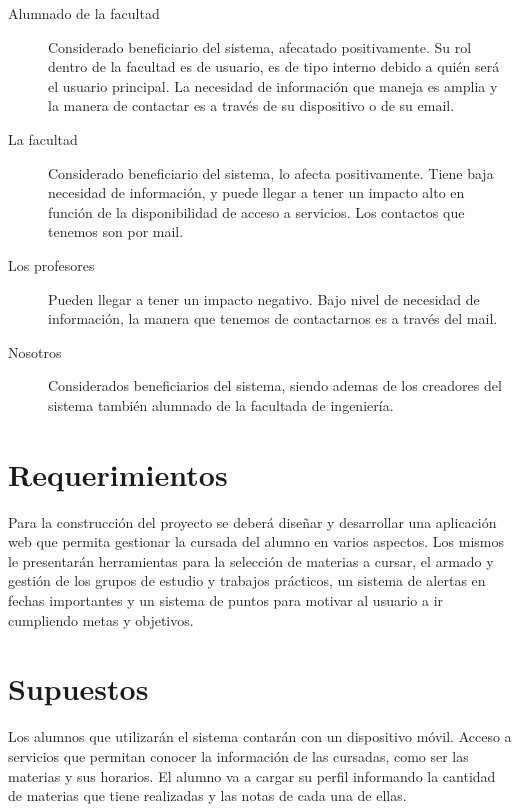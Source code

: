 \documentclass[a4paper,11pt]{article}
\begin{document}
\begin{description}

  \item[Alumnado de la facultad] 

    Considerado beneficiario del sistema, afecatado positivamente. Su rol
    dentro de la facultad es de usuario, es de tipo interno debido a quién será
    el usuario principal. La necesidad de información que maneja es amplia y la
    manera de contactar es a través de su dispositivo o de su email.

  \item[La facultad]

    Considerado beneficiario del sistema, lo afecta positivamente. Tiene baja
    necesidad de información, y puede llegar a tener un impacto alto en función
    de la disponibilidad de acceso a servicios. Los contactos que tenemos son
    por mail. 
  
  \item[Los profesores]
    
    Pueden llegar a tener un impacto negativo. Bajo nivel de necesidad de
    información, la manera que tenemos de contactarnos es a través del mail.

  \item[Nosotros]
    
    Considerados beneficiarios del sistema, siendo ademas de los creadores del
    sistema también alumnado de la facultada de ingeniería.

\end{description}

\section{Requerimientos}

  Para la construcción del proyecto se deberá diseñar y desarrollar una
  aplicación web que permita gestionar la cursada del alumno en varios
  aspectos. Los mismos le presentarán herramientas para la selección de
  materias a cursar, el armado y gestión de los grupos de estudio y trabajos
  prácticos, un sistema de alertas en fechas importantes y un sistema de puntos
  para motivar al usuario a ir cumpliendo metas y objetivos.

\section{Supuestos}

  Los alumnos que utilizarán el sistema contarán con un dispositivo móvil.
  Acceso a servicios que permitan conocer la información de las cursadas, como
  ser las materias y sus horarios.  El alumno va a cargar su perfil informando
  la cantidad de materias que tiene realizadas y las notas de cada una de
  ellas.
\end{document}
